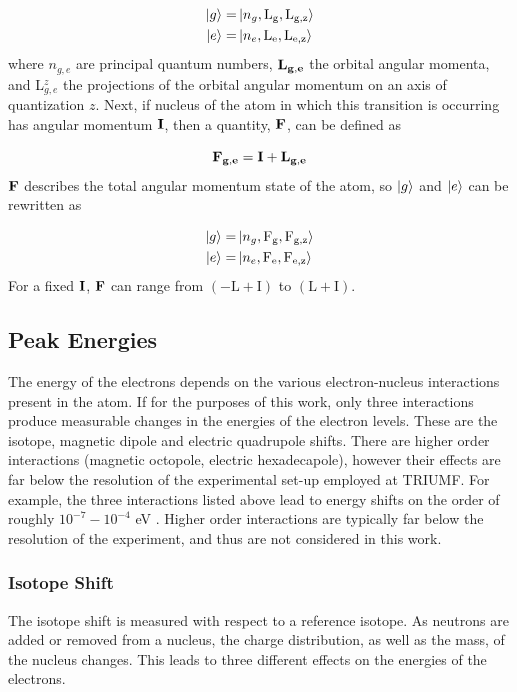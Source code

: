 \begin{align}
\ket{g} =& \ket{n_g,\mathrm{L_g,L_{g,z}}}\\
\ket{e} =& \ket{n_e,\mathrm{L_e,L_{e,z}}}
\end{align}
where $n_{g,e}$ are principal quantum numbers, $\bf{L_{g,e}}$ the orbital angular momenta, and L$_{g,e}^z$ the projections of the orbital angular momentum on an axis of quantization $z$. Next, if nucleus of the atom in which this transition is occurring has angular momentum $\bf{I}$, then a quantity, $\bf{F}$, can be defined as 

\begin{equation}
\bf{F_{g,e}} = \bf{I} + \bf{L_{g,e}}
\end{equation}
$\bf{F}$ describes the total angular momentum state of the atom, so $\ket{g}$ and $\ket{e}$ can be rewritten as

\begin{align}
\ket{g} =& \ket{n_g,\mathrm{F_g, F_{g,z}}}\\
\ket{e} =& \ket{n_e,\mathrm{F_e, F_{e,z}}}
\end{align}
For a fixed $\bf{I}$, $\bf{F}$ can range from $(-\mathrm{L+I})$ to $(\mathrm{L+I})$.
\subsection{Peak Energies}
The energy of the electrons depends on the various electron-nucleus interactions present in the atom. If for the purposes of this work, only three interactions produce measurable changes in the energies of the electron levels. These are the isotope, magnetic dipole and electric quadrupole shifts. There are higher order interactions (magnetic octopole, electric hexadecapole), however their effects are far below the resolution of the experimental set-up employed at TRIUMF. For example, the three interactions listed above lead to energy shifts on the order of roughly $10^{-7}-10^{-4}$ eV \cite{ModAN}. Higher order interactions are typically far below the resolution of the experiment, and thus are not considered in this work. 

\subsubsection*{Isotope Shift}
The isotope shift is measured with respect to a reference isotope. As neutrons are added or removed from a nucleus, the charge distribution, as well as the mass, of the nucleus changes. This leads to three different effects on the energies of the electrons. 

